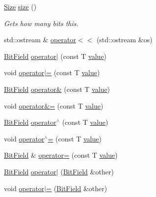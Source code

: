 \begin{DoxyCompactItemize}
\hyperlink{namespacemc_ad1c06461067735b3b17e0df612532c4e}{Size} \hyperlink{structmc_1_1_bit_field_a6c48d4dec674ff73a1a06239e9b6175d}{size} ()
\begin{DoxyCompactList}\small\item\em Gets how many bits this. \end{DoxyCompactList}\item 
std\+::ostream \& \hyperlink{structmc_1_1_bit_field_a08bb4029a5c575e4ccfd03b720532353}{operator$<$$<$} (std\+::ostream \&os)
\item 
\hyperlink{structmc_1_1_bit_field}{Bit\+Field} \hyperlink{structmc_1_1_bit_field_a3f1651fa9c9561c938e515587ebc33de}{operator$\vert$} (const T \hyperlink{structmc_1_1_bit_field_ac4a96f98afd87fe71a7ad7c288e9e7d6}{value})
\item 
void \hyperlink{structmc_1_1_bit_field_a839e7d552983d6d8225fbe806c11267c}{operator$\vert$=} (const T \hyperlink{structmc_1_1_bit_field_ac4a96f98afd87fe71a7ad7c288e9e7d6}{value})
\item 
\hyperlink{structmc_1_1_bit_field}{Bit\+Field} \hyperlink{structmc_1_1_bit_field_a6a77fd2eb84d02dbc8ae25ed2dac9f21}{operator\&} (const T \hyperlink{structmc_1_1_bit_field_ac4a96f98afd87fe71a7ad7c288e9e7d6}{value})
\item 
void \hyperlink{structmc_1_1_bit_field_a456ed982073855a429d599fa6116b381}{operator\&=} (const T \hyperlink{structmc_1_1_bit_field_ac4a96f98afd87fe71a7ad7c288e9e7d6}{value})
\item 
\hyperlink{structmc_1_1_bit_field}{Bit\+Field} \hyperlink{structmc_1_1_bit_field_ad27805f037eb8bdb6ab509f4d6663fb0}{operator$^\wedge$} (const T \hyperlink{structmc_1_1_bit_field_ac4a96f98afd87fe71a7ad7c288e9e7d6}{value})
\item 
void \hyperlink{structmc_1_1_bit_field_ab7cec8f0964de4d63496d8a4fbbdf229}{operator$^\wedge$=} (const T \hyperlink{structmc_1_1_bit_field_ac4a96f98afd87fe71a7ad7c288e9e7d6}{value})
\item 
\hyperlink{structmc_1_1_bit_field}{Bit\+Field} \& \hyperlink{structmc_1_1_bit_field_a12326547677591b98ba35a9706ef25e5}{operator=} (const T \hyperlink{structmc_1_1_bit_field_ac4a96f98afd87fe71a7ad7c288e9e7d6}{value})
\item 
\hyperlink{structmc_1_1_bit_field}{Bit\+Field} \hyperlink{structmc_1_1_bit_field_a253d80bcef1bc2b0729786d223dc7d4c}{operator$\vert$} (\hyperlink{structmc_1_1_bit_field}{Bit\+Field} \&other)
\item 
void \hyperlink{structmc_1_1_bit_field_afd13178f2d6cbe30af39526a9351611f}{operator$\vert$=} (\hyperlink{structmc_1_1_bit_field}{Bit\+Field} \&other)

\end{DoxyCompactItemize}

